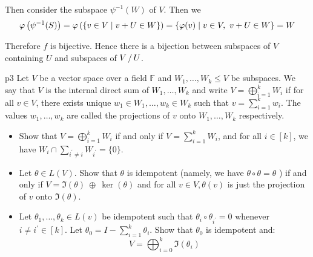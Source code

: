 \documentclass[a4paper, 11pt]{article}
\begin{document}
{\begin{enumerate}[label=(\alph*)]
\begin{itemize}
	Then consider the subspace $\psi^{-1}(W)$ of $V$. Then we  $$\varphi\left(\psi^{-1}(S)\right)=\varphi\left(\{v\in V\mid v+U\in W\}\right)=\{\varphi(v)\mid v\in V,\ v+U\in W\}=W$$
\end{itemize}
Therefore $f$ is bijective. Hence there is a bijection between subspaces of $V$ containing $U$ and subspaces of $\quotient{V}{U}$. 
\end{enumerate}
}
\pagebreak

\begin{problem}{%
	}{p3%
	}
Let $V$ be a vector space over a field $\mathbb{F}$ and $W_1, \ldots, W_k \leq V$ be subspaces. We say that $V$ is the internal direct sum of $W_1, \ldots, W_k$ and write $V=\bigoplus\limits_{i=1}^k W_i$ if for all $v \in V$, there exists unique $w_1 \in W_1, \ldots, w_k \in W_k$ such that $v=\sum\limits_{i=1}^k w_i$. The values $w_1, \ldots, w_k$ are called the projections of $v$ onto $W_1, \ldots, W_k$ respectively.\begin{itemize}
	\item Show that $V=\bigoplus\limits_{i=1}^k W_i$ if and only if $V=\sum\limits_{i=1}^k W_i$, and for all $i \in[k]$, we have $W_i \cap \sum\limits_{i^{\prime} \neq i} W_{i^{\prime}}=\{0\}$.
	\item Let $\theta \in L(V)$. Show that $\theta$ is idempotent (namely, we have $\theta \circ \theta=\theta$ ) if and only if $V=\Im(\theta) \ \oplus \ \ker(\theta)$ and for all $v \in V, \theta(v)$ is just the projection of $v$ onto $\Im(\theta)$.
	\item Let $\theta_1, \ldots, \theta_k \in L(v)$ be idempotent such that $\theta_i \circ \theta_{i^{\prime}}=0$ whenever $i \neq i^{\prime} \in[k]$. Let $\theta_0=I-\sum\limits_{i=1}^k \theta_i$. Show that $\theta_0$ is idempotent and:
	$$
	V=\bigoplus_{i=0}^k \Im\left(\theta_i\right)
	$$
\end{itemize}

\end{problem}
\end{document}
